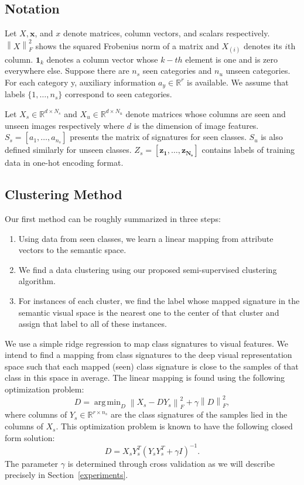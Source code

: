 \documentclass[letterpaper]{article}
\newcommand{\norm}[1]{\left \lVert #1 \right \rVert_{F}^2}
\DeclareMathOperator*{\argmin}{arg\,min}
\begin{document}
\subsection{Notation}
Let $X, \mathbf{x}$, and $x$ denote matrices, column vectors, and scalars respectively. $\norm{X}$ shows the squared Frobenius norm of a matrix and
$X_{(i)}$ denotes its $i$th column. $\mathbf{1}_k$ denotes a column vector whose $k-th$ element is one and is zero everywhere else.
Suppose there are $n_s$ seen categories and $n_u$ unseen categories. For each category y,
auxiliary information $a_y \in \mathbb{R}^r$ is available. We assume that labels $\{1, \ldots, n_s \}$ correspond to seen categories.

Let $X_s \in \mathbb{R}^{d \times N_s}$ and $X_u \in \mathbb{R}^{d \times N_u}$
denote matrices whose columns are seen and unseen images respectively where $d$ is the dimension of image features.
$S_s = [a_1, \ldots, a_{n_s}]$ presents the matrix of signatures for seen classes. $S_u$ is also defined similarly for unseen classes.
$Z_s = [ \mathbf{z_1}, \ldots, \mathbf{z_{N_s}} ]$
contains labels of training data in one-hot encoding format.

\subsection{Clustering Method} \label{clustering}
Our first method can be roughly summarized in three steps:
\begin{enumerate}
  \item Using data from seen classes, we learn a linear mapping from attribute vectors to the semantic space.
  \item We find a data clustering using our proposed semi-supervised clustering algorithm.
  \item For instances of each cluster, we find the label whose mapped signature in the semantic visual space is the nearest one to the center of that cluster and assign that label to all of these instances.
\end{enumerate}

We use a simple ridge regression to map class signatures to visual features. We intend to find a mapping from class signatures
 to the deep visual representation space such that each mapped (seen) class signature is close to the samples of that class in this space in average.
The linear mapping is found using the following optimization problem:
\begin{equation} \label{eq:mapping}
  D = \argmin_D \norm{X_s - D Y_s} + \gamma \norm{D},
\end{equation}
where columns of $ Y_s \in \mathbb{R}^{r \times n_s} $ are the class signatures of the samples lied in the columns of $X_s$.
This optimization problem is known to have the following closed form solution:
\begin{equation} \label{eq:dic}
  D = X_s Y_s^T (Y_s Y_s^T + \gamma I)^{-1}.
\end{equation}
The parameter $\gamma$ is determined through cross validation as we will describe precisely in Section~\ref{experiments}.
\end{document}
